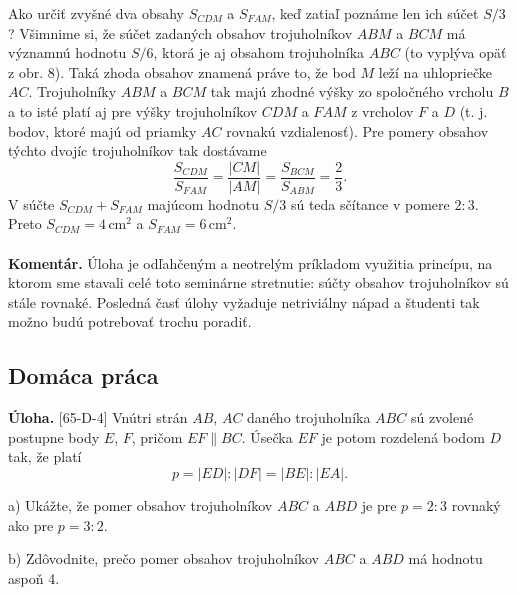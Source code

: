 \documentclass[11pt,a4paper,oneside,final]{book}
\newcommand{\kom}{\textbf{Komentár.} }
\newcommand{\ul}{\textbf{Úloha.} }
\begin{document}
Ako určiť zvyšné dva obsahy $S_{CDM}$ a $S_{FAM}$, keď zatiaľ poznáme len ich súčet $S/3$? Všimnime si, že súčet zadaných obsahov trojuholníkov $ABM$ a $BCM$ má významnú hodnotu $S/6$, ktorá je aj obsahom trojuholníka $ABC$ (to vyplýva opäť z obr. 8). Taká zhoda obsahov znamená práve to, že bod $M$ leží na uhlopriečke $AC$. Trojuholníky $ABM$ a $BCM$ tak majú zhodné výšky zo spoločného vrcholu $B$ a to isté platí aj pre výšky trojuholníkov $CDM$ a $FAM$ z vrcholov $F$ a $D$ (t. j. bodov, ktoré majú od priamky $AC$ rovnakú vzdialenosť). Pre pomery obsahov týchto dvojíc trojuholníkov tak dostávame
$$\frac{S_{CDM}}{S_{FAM}}=\frac{|CM|}{|AM|}=\frac{S_{BCM}}{S_{ABM}}=\frac{2}{3}.$$
V súčte $S_{CDM} + S_{FAM}$ majúcom hodnotu $S/3$ sú teda sčítance v pomere $2 : 3$. Preto $S_{CDM} =4$\,cm$^2$ a $S_{FAM} = 6$\,cm$^2$.\\
\\
\kom Úloha je odľahčeným a neotrelým príkladom využitia princípu, na ktorom sme stavali celé toto seminárne stretnutie: súčty obsahov  trojuholníkov sú stále rovnaké. Posledná časť úlohy vyžaduje netriviálny nápad a študenti tak možno budú potrebovať trochu poradiť.
\subsection*{Domáca práca}
\begin{tcolorbox}[breakable,notitle,boxrule=0pt,colback=light-gray,colframe=light-gray]\ul [65-D-4] Vnútri strán $AB$, $AC$ daného trojuholníka $ABC$ sú zvolené postupne body $E$, $F$, pričom $EF \parallel BC$. Úsečka $EF$ je potom rozdelená bodom $D$ tak, že platí $$p = |ED| : |DF | = |BE| : |EA|.$$

a) Ukážte, že pomer obsahov trojuholníkov $ABC$ a $ABD$ je pre $p = 2 : 3$ rovnaký ako pre $p = 3 : 2$.

b) Zdôvodnite, prečo pomer obsahov trojuholníkov $ABC$ a $ABD$ má hodnotu aspoň 4.

\end{tcolorbox}
\end{document}
